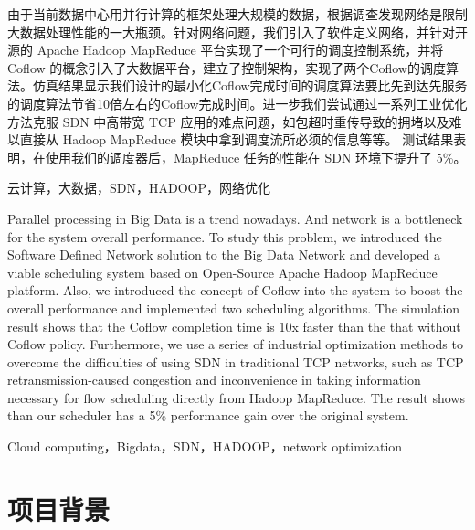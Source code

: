\documentclass[a4paper, 11pt]{article}                                                   %
\begin{document}
\begin{CJK*}{UTF8}{song}
由于当前数据中心用并行计算的框架处理大规模的数据，根据调查发现网络是限制大数据处理性能的一大瓶颈。针对网络问题，我们引入了软件定义网络，并针对开源的 Apache Hadoop MapReduce 平台实现了一个可行的调度控制系统，并将 Coflow 的概念引入了大数据平台，建立了控制架构，实现了两个Coflow的调度算法。仿真结果显示我们设计的最小化Coflow完成时间的调度算法要比先到达先服务的调度算法节省10倍左右的Coflow完成时间。进一步我们尝试通过一系列工业优化方法克服 SDN 中高带宽 TCP 应用的难点问题，如包超时重传导致的拥堵以及难以直接从 Hadoop MapReduce 模块中拿到调度流所必须的信息等等。 测试结果表明，在使用我们的调度器后，MapReduce 任务的性能在 SDN 环境下提升了 5\%。

{ \fontsize{10pt}{15pt}}云计算，大数据，SDN，HADOOP，网络优化
\clearpage
\begin{center}
  { \fontsize{15pt}{18pt}}
\end{center}

Parallel processing in Big Data is a trend nowadays. And network is a bottleneck for the system overall performance. To study this problem, we introduced the Software Defined Network solution to the Big Data Network and developed a viable scheduling system based on Open-Source Apache Hadoop MapReduce platform. Also, we introduced the concept of Coflow into the system to boost the overall performance and implemented two scheduling algorithms. The simulation result shows that the Coflow completion time is 10x faster than the that without Coflow policy. Furthermore, we use a series of industrial optimization methods to overcome the difficulties of using SDN in traditional TCP networks, such as TCP retransmission-caused congestion and inconvenience in taking information necessary for flow scheduling directly from Hadoop MapReduce. The result shows than our scheduler has a 5\% performance gain over the original system.

{ \fontsize{10pt}{15pt}}Cloud computing，Bigdata，SDN，HADOOP，network optimization
\clearpage
\tableofcontents
\section{项目背景}

\end{CJK*}
\end{document}
